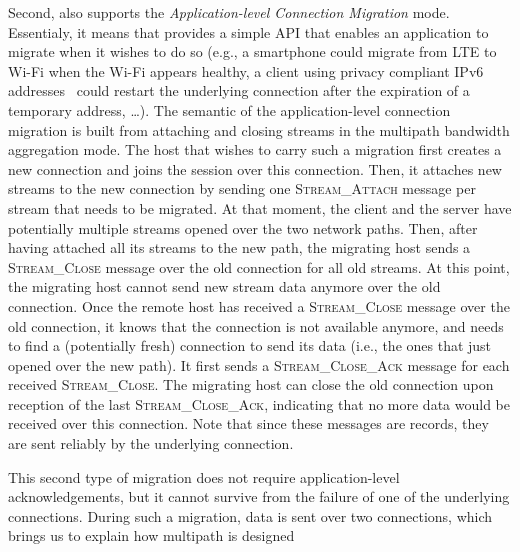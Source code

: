 Second, \tcpls also supports the \textit{Application-level Connection Migration} mode. Essentialy, it means that \tcpls provides a simple API that enables an application to migrate when it wishes to do so (e.g., a smartphone could migrate from LTE to Wi-Fi when the Wi-Fi appears healthy, a client using privacy compliant IPv6 addresses~\cite{rfc4941} could restart the underlying \tcp connection after the expiration of a temporary address, \ldots). The semantic of the application-level connection migration is built from attaching and closing streams in the multipath bandwidth aggregation mode. The host that wishes to carry such a migration first creates a new \tcp connection and joins the \tcpls session over this connection. Then, it attaches new streams to the new connection by sending one \textsc{Stream\_Attach} message per stream that needs to be migrated. At that moment, the client and the server have potentially multiple streams opened over the two network paths. Then, after having attached all its streams to the new path, the migrating host sends a \textsc{Stream\_Close} message over the old \tcp connection for all old streams. At this point, the migrating host cannot send new stream data anymore over the old connection. Once the remote host has received a
\textsc{Stream\_Close} message over the old \tcp connection, it knows that the
connection is not available anymore, and needs to find a (potentially fresh) connection to send its data (i.e., the ones that just opened over the new path). It first sends a \textsc{Stream\_Close\_Ack} message for each received \textsc{Stream\_Close}. The migrating host can close the old connection upon reception of the last \textsc{Stream\_Close\_Ack}, indicating that no more data would be received over this connection. Note that since these messages are \tls records, they are sent reliably by the underlying \tcp connection.

This second type of migration does not require application-level acknowledgements, but it cannot survive from the failure of one of the underlying connections. During such a migration, data is sent over two connections, which brings us to explain how multipath is designed



